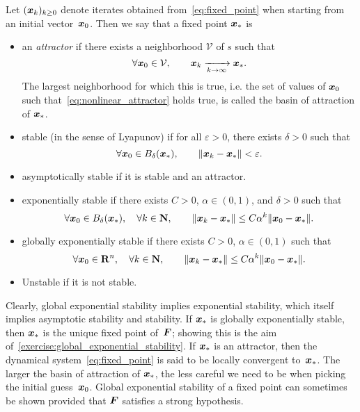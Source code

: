 \begin{definition}
    Let $(\mathbf{\boldsymbol{x}}_k)_{k\geq0}$ denote iterates obtained from~\eqref{eq:fixed_point} when starting from an initial vector~$\mathbf{\boldsymbol{x}}_0$.
    Then we say that a fixed point $\mathbf{\boldsymbol{x}}_*$ is
    \begin{itemize}
        \item
            an \emph{attractor} if there exists a neighborhood $\mathcal V$ of $s$ such that
            \begin{equation}
                \label{eq:nonlinear_attractor}
                \forall \mathbf{\boldsymbol{x}}_0 \in \mathcal V, \qquad
                \mathbf{\boldsymbol{x}}_k \xrightarrow[k \to \infty]{} \mathbf{\boldsymbol{x}}_*.
            \end{equation}
            The largest neighborhood for which this is true,
            i.e. the set of values of $\mathbf{\boldsymbol{x}}_0$ such that~\eqref{eq:nonlinear_attractor} holds true,
            is called the basin of attraction of $\mathbf{\boldsymbol{x}}_*$.

        \item
            stable (in the sense of Lyapunov) if for all $\varepsilon > 0$,
            there exists $\delta > 0$ such that
            \[
                \forall \mathbf{\boldsymbol{x}}_0 \in B_{\delta}(\mathbf{\boldsymbol{x}}_*), \qquad
                \lVert\mathbf{\boldsymbol{x}}_k - \mathbf{\boldsymbol{x}}_*\rVert < \varepsilon.
            \]

        \item
            asymptotically stable if it is stable and an attractor.

        \item
            exponentially stable if there exists $C > 0$, $\alpha \in (0, 1)$, and $\delta > 0$ such that
            \[
                \forall \mathbf{\boldsymbol{x}}_0 \in B_{\delta}(\mathbf{\boldsymbol{x}}_*),
                \quad \forall k \in \mathbf N, \qquad
                \lVert\mathbf{\boldsymbol{x}}_k - \mathbf{\boldsymbol{x}}_*\rVert \leq C \alpha^k \lVert\mathbf{\boldsymbol{x}}_0 - \mathbf{\boldsymbol{x}}_*\rVert.
            \]

        \item
            globally exponentially stable if there exists $C > 0$, $\alpha \in (0, 1)$ such that
            \[
                \forall \mathbf{\boldsymbol{x}}_0 \in \mathbf R^n,
                \quad \forall k \in \mathbf N, \qquad
                \lVert\mathbf{\boldsymbol{x}}_k - \mathbf{\boldsymbol{x}}_*\rVert \leq C \alpha^k \lVert\mathbf{\boldsymbol{x}}_0 - \mathbf{\boldsymbol{x}}_*\rVert.
            \]
        \item
            Unstable if it is not stable.
    \end{itemize}
\end{definition}
Clearly, global exponential stability implies exponential stability,
which itself implies asymptotic stability and stability.
If $\mathbf{\boldsymbol{x}}_*$ is globally exponentially stable,
then $\mathbf{\boldsymbol{x}}_*$ is the unique fixed point of~$\mathbf{\boldsymbol{F}}$;
showing this is the aim of~\cref{exercise:global_exponential_stability}.
If $\mathbf{\boldsymbol{x}}_*$ is an attractor,
then the dynamical system~\eqref{eq:fixed_point} is said to be locally convergent to~$\mathbf{\boldsymbol{x}}_*$.
The larger the basin of attraction of $\mathbf{\boldsymbol{x}}_*$,
the less careful we need to be when picking the initial guess~$\mathbf{\boldsymbol{x}}_0$.
Global exponential stability of a fixed point can sometimes be shown
provided that $\mathbf{\boldsymbol{F}}$ satisfies a strong hypothesis.

